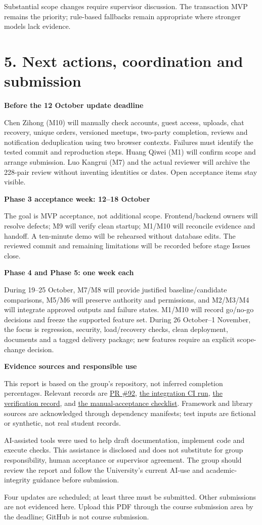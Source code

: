 \documentclass[12pt,a4paper]{article}
\newcommand{\heading}[1]{\vspace{6pt}\textbf{#1}\par}
\newcommand{\evidence}[2]{\href{#1}{#2}}
\begin{document}
Substantial scope changes require supervisor discussion. The transaction MVP remains the priority; rule-based fallbacks remain appropriate where stronger models lack evidence.

\clearpage
\section*{5. Next actions, coordination and submission}
\heading{Before the 12 October update deadline}
Chen Zihong (M10) will manually check accounts, guest access, uploads, chat recovery, unique orders, versioned meetups, two-party completion, reviews and notification deduplication using two browser contexts. Failures must identify the tested commit and reproduction steps. Huang Qiwei (M1) will confirm scope and arrange submission. Luo Kangrui (M7) and the actual reviewer will archive the 228-pair review without inventing identities or dates. Open acceptance items stay visible.

\heading{Phase 3 acceptance week: 12--18 October}
The goal is MVP acceptance, not additional scope. Frontend/backend owners will resolve defects; M9 will verify clean startup; M1/M10 will reconcile evidence and handoff. A ten-minute demo will be rehearsed without database edits. The reviewed commit and remaining limitations will be recorded before stage Issues close.

\heading{Phase 4 and Phase 5: one week each}
During 19--25 October, M7/M8 will provide justified baseline/candidate comparisons, M5/M6 will preserve authority and permissions, and M2/M3/M4 will integrate approved outputs and failure states. M1/M10 will record go/no-go decisions and freeze the supported feature set. During 26 October--1 November, the focus is regression, security, load/recovery checks, clean deployment, documents and a tagged delivery package; new features require an explicit scope-change decision.

\heading{Evidence sources and responsible use}
This report is based on the group's repository, not inferred completion percentages. Relevant records are \evidence{https://github.com/Huang0283/CampusLoop/pull/92}{PR \#92}, \evidence{https://github.com/Huang0283/CampusLoop/actions/runs/37920440816}{the integration CI run}, \evidence{https://github.com/Huang0283/CampusLoop/blob/8853338/docs/evidence/phase-3/management-quality/verification.md}{the verification record}, and \evidence{https://github.com/Huang0283/CampusLoop/blob/8853338/docs/evidence/phase-3/management-quality/m10-manual-acceptance.md}{the manual-acceptance checklist}. Framework and library sources are acknowledged through dependency manifests; test inputs are fictional or synthetic, not real student records.

AI-assisted tools were used to help draft documentation, implement code and execute checks. This assistance is disclosed and does not substitute for group responsibility, human acceptance or supervisor agreement. The group should review the report and follow the University's current AI-use and academic-integrity guidance before submission.

Four updates are scheduled; at least three must be submitted. Other submissions are not evidenced here. Upload this PDF through the course submission area by the deadline; GitHub is not course submission.
\end{document}
